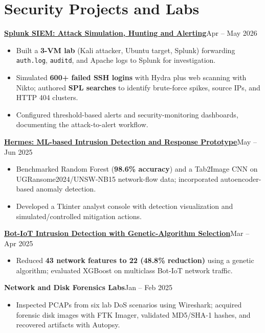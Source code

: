 \documentclass[a4paper,11pt]{article}
\newcommand{\proj}[2]{\textbf{#1}\hfill{\footnotesize #2}\vspace{-4pt}}
\newenvironment{tightbullets}{\begin{itemize}[leftmargin=1.25em,label=\textbullet,topsep=2pt,itemsep=2pt,parsep=0pt,partopsep=0pt]}{\end{itemize}\vspace{-4pt}}
\begin{document}
\section{Security Projects and Labs}
\proj{\href{https://github.com/devanshukranjan/AI-Cybersecurity-Portfolio/tree/main/siem-investigations/splunk-siem-lab}{Splunk SIEM: Attack Simulation, Hunting and Alerting}}{Apr -- May 2026}
\begin{tightbullets}
\item Built a \textbf{3-VM lab} (Kali attacker, Ubuntu target, Splunk) forwarding \texttt{auth.log}, \texttt{auditd}, and Apache logs to Splunk for investigation.
\item Simulated \textbf{600+ failed SSH logins} with Hydra plus web scanning with Nikto; authored \textbf{SPL searches} to identify brute-force spikes, source IPs, and HTTP 404 clusters.
\item Configured threshold-based alerts and security-monitoring dashboards, documenting the attack-to-alert workflow.
\end{tightbullets}
\proj{\href{https://github.com/devanshukranjan/AI-Cybersecurity-Portfolio/tree/main/ai-intrusion-detection/hermes-ids}{Hermes: ML-based Intrusion Detection and Response Prototype}}{May -- Jun 2025}
\begin{tightbullets}
\item Benchmarked Random Forest (\textbf{98.6\% accuracy}) and a Tab2Image CNN on UGRansome2024/UNSW-NB15 network-flow data; incorporated autoencoder-based anomaly detection.
\item Developed a Tkinter analyst console with detection visualization and simulated/controlled mitigation actions.
\end{tightbullets}
\proj{\href{https://github.com/devanshukranjan/AI-Cybersecurity-Portfolio/tree/main/ai-intrusion-detection/bot-iot-ga-ids}{Bot-IoT Intrusion Detection with Genetic-Algorithm Selection}}{Mar -- Apr 2025}
\begin{tightbullets}
\item Reduced \textbf{43 network features to 22 (48.8\% reduction)} using a genetic algorithm; evaluated XGBoost on multiclass Bot-IoT network traffic.
\end{tightbullets}
\proj{Network and Disk Forensics Labs}{Jan -- Feb 2025}
\begin{tightbullets}
\item Inspected PCAPs from six lab DoS scenarios using Wireshark; acquired forensic disk images with FTK Imager, validated MD5/SHA-1 hashes, and recovered artifacts with Autopsy.
\end{tightbullets}
\end{document}
